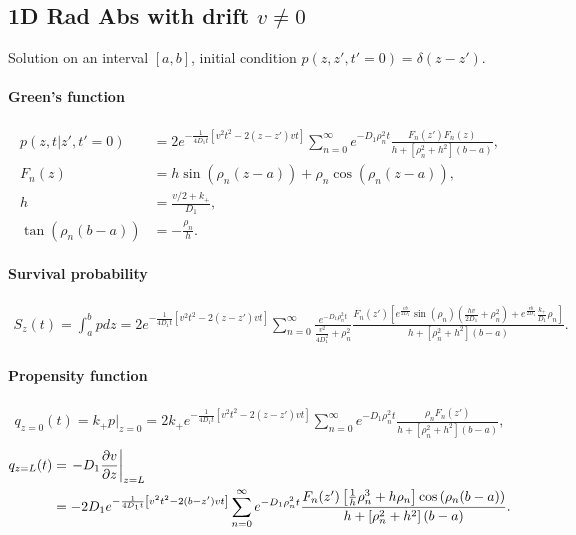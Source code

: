 
\subsection{1D Rad Abs with drift $v\neq 0$}

Solution on an interval $[a,b]$, initial condition $p(z,z',t'=0)=\delta (z-z')$.

\newcommand{\rn}{\rho_n}

\paragraph{Green's function}
\begin{align}
  p(z,t|z',t'=0) &= 2e^{-\frac{1}{4D_1t}\left[v^2t^2 - 2(z-z')vt \right]}
  \sum_{n=0}^{\infty}
  e^{-D_1\rn^2t} \frac{ F_n(z')F_n(z) }
  {h + \left[\rn^2 + h^2\right](b-a)}, \\
  F_n(z) &= h\sin\left(\rn(z-a)\right) +  \rn\cos\left(\rn(z-a)\right)  , \\
  h &= \frac{v/2 + k_+}{D_1}, \\
  \tan\left(\rn(b-a)\right)&= -\frac{\rn}{h}.
\end{align}

\paragraph{Survival probability}
\begin{align}
  S_z(t) = \int_a^b pdz
  = 2e^{-\frac{1}{4D_1t}\left[ v^2t^2 - 2(z-z')vt \right]}
    \sum_{n=0}^{\infty} \frac{ e^{-D_1\rn^2t} }{ \frac{v^2}{4D_1^2} + \rn^2 }
    \frac{F_n(z')
    \left[ e^{\frac{vb}{2D_1}} \sin(\rn)\left( \frac{hv}{2D_1} + \rn^2 \right) + e^{\frac{vb}{2D_1}}\frac{k_+}{D_1}\rn \right] }
    {h + \left[\rn^2 + h^2\right](b-a)}.
\end{align}

\paragraph{Propensity function}
\begin{align}
  q_{z=0}(t) = k_+ p|_{z=0} = 2k_+ e^{-\frac{1}{4D_1t}\left[v^2t^2 - 2(z-z')vt \right]} 
  \sum_{n=0}^{\infty} e^{-D_1\rn^2t}
  \frac{ \rn F_n(z')} {h + \left[\rn^2 + h^2\right](b-a)},
\end{align}
\begin{align}
  q_{z=L}(t) &= \left.- D_1 \pd{v}{z}\right|_{z=L} \\
  &=  -2D_1 e^{-\frac{1}{4D_1t}\left[v^2t^2 - 2(b-z')vt \right]} 
    \sum_{n=0}^{\infty} e^{-D_1\rn^2t}
    \frac{F_n(z') \left[\frac{1}{h}\rn^3 + h\rn\right]\cos\left(\rn (b-a)\right)
 }
  {h + \left[\rn^2 + h^2\right](b-a)}.
\end{align}

